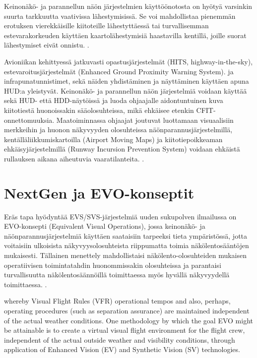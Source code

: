 \documentclass[utf8,bachelor,manualbib]{gradu3}
\begin{document}
Keinonäkö- ja parannellun näön järjestelmien käyttöönotosta on hyötyä varsinkin suurta tarkkuutta vaativissa lähestymisissä. Se voi mahdollistaa pienemmän erotuksen vierekkäisille kiitoteille lähestyttäessä tai turvallisemman estevarakorkeuden käyttäen kaartolähestymisiä haastavilla kentillä, joille suorat lähestymiset eivät onnistu. \citep{schnellym2004}.

Avioniikan kehittyessä jatkuvasti opastusjärjestelmät (HITS, highway-in-the-sky), estevaroitusjärjestelmät (Enhanced Ground Proximity Warning System). ja infrapunatunnistimet, sekä näiden yhdistäminen ja näyttäminen käyttäen apuna HUD:a yleistyvät. Keinonäkö- ja parannellun näön järjestelmiä voidaan käyttää sekä HUD- että HDD-näytöissä ja luoda ohjaajalle aidontuntuinen kuva kiitotiestä huonoissakin sääolosuhteissa, mikä ehkäisee etenkin CFIT-onnettomuuksia. Maatoiminnassa ohjaajat joutuvat luottamaan visuaalisiin merkkeihin ja huonon näkyvyyden olosuhteissa näönparannusjärjestelmillä, kentälläliikkumiskartoilla (Airport Moving Maps) ja kiitotiepoikkeaman ehkäisyjärjestelmillä (Runway Incursion Prevention System) voidaan ehkäistä rullauksen aikana aiheutuvia vaaratilanteita. \citep{crawfordneal2006}.

\section{NextGen ja EVO-konseptit}

Eräs tapa hyödyntää EVS/SVS-järjestelmiä uuden sukupolven ilmailussa on EVO-konsepti (Equivalent Visual Operations), jossa keinonäkö- ja näönparannusjärjestelmiä käyttäen saataisiin tarpeeksi tieta ympäristössä, jotta voitaisiin ulkoisista näkyvyysolosuhteista riippumatta toimia näkölentosääntöjen mukaisesti. Tällainen menettely mahdollistaisi näkölento-olosuhteiden mukaisen operatiivisen toimintatahdin huonommissakin olosuhteissa ja parantaisi turvallisuutta näkölentosäännöillä toimittaessa myös hyvällä näkyvyydellä toimittaessa. \citep{prinzel2013}.

whereby Visual Flight Rules (VFR) operational tempos and also, perhaps, operating
procedures (such as separation assurance) are maintained independent of the actual weather conditions. One
methodology by which the goal EVO might be attainable is to create a virtual visual flight environment for
the flight crew, independent of the actual outside weather and visibility conditions, through application of
Enhanced Vision (EV) and Synthetic Vision (SV) technologies. \citep{baileyym2007}
\end{document}
